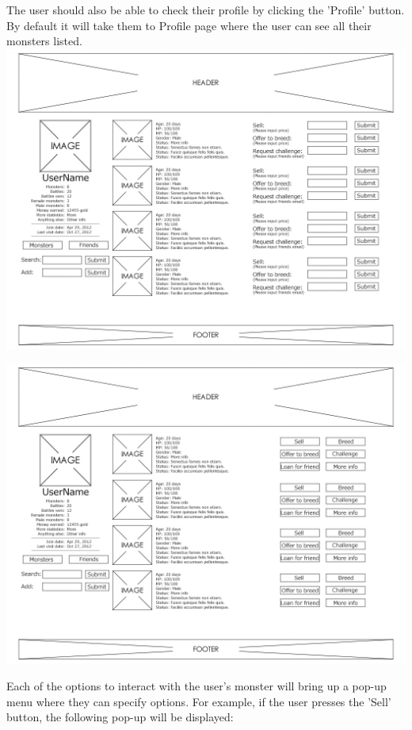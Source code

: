 \documentclass[a4paper]{article}
\begin{document}
The user should also be able to check their profile by clicking the 'Profile' button. By default it will take them to Profile page where the user can see all their monsters listed.\\

\includegraphics[width=\textwidth]{img/UI4.jpg}

\includegraphics[width=\textwidth]{img/UI5.jpg}

Each of the options to interact with the user's monster will bring up a pop-up menu where they can specify options. For example, if the user presses the 'Sell' button, the following pop-up will be displayed:
\end{document}
